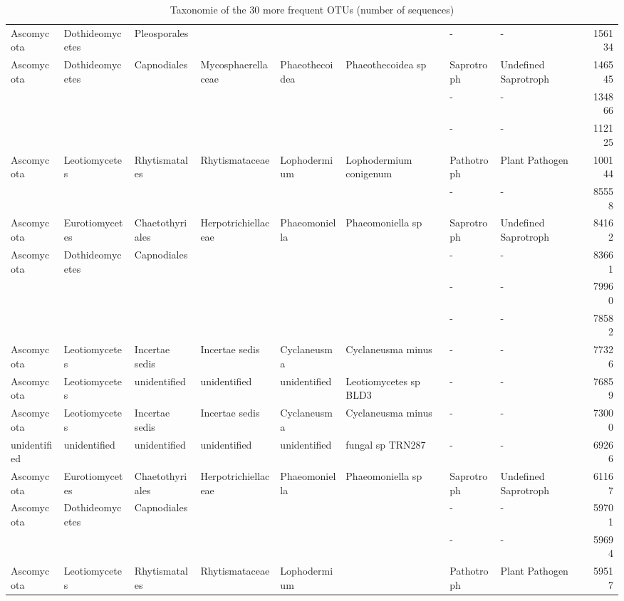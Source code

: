 \documentclass[12pt]{article}\usepackage[]{graphicx}\usepackage[]{color}
\numberwithin{figure}{section}
\begin{document}
\begin{landscape}
\begin{table}[ht]
\begin{tabular}{llllllllr}
  Ascomycota & Dothideomycetes & Pleosporales &  &  &  & - & - & 156134 \\ 
  Ascomycota & Dothideomycetes & Capnodiales & Mycosphaerellaceae & Phaeothecoidea & Phaeothecoidea sp & Saprotroph & Undefined Saprotroph & 146545 \\ 
   &  &  &  &  &  & - & - & 134866 \\ 
   &  &  &  &  &  & - & - & 112125 \\ 
  Ascomycota & Leotiomycetes & Rhytismatales & Rhytismataceae & Lophodermium & Lophodermium conigenum & Pathotroph & Plant Pathogen & 100144 \\ 
   &  &  &  &  &  & - & - & 85558 \\ 
  Ascomycota & Eurotiomycetes & Chaetothyriales & Herpotrichiellaceae & Phaeomoniella & Phaeomoniella sp & Saprotroph & Undefined Saprotroph & 84162 \\ 
  Ascomycota & Dothideomycetes & Capnodiales &  &  &  & - & - & 83661 \\ 
   &  &  &  &  &  & - & - & 79960 \\ 
   &  &  &  &  &  & - & - & 78582 \\ 
  Ascomycota & Leotiomycetes & Incertae sedis & Incertae sedis & Cyclaneusma & Cyclaneusma minus & - & - & 77326 \\ 
  Ascomycota & Leotiomycetes & unidentified & unidentified & unidentified & Leotiomycetes sp BLD3 & - & - & 76859 \\ 
  Ascomycota & Leotiomycetes & Incertae sedis & Incertae sedis & Cyclaneusma & Cyclaneusma minus & - & - & 73000 \\ 
  unidentified & unidentified & unidentified & unidentified & unidentified & fungal sp TRN287 & - & - & 69266 \\ 
  Ascomycota & Eurotiomycetes & Chaetothyriales & Herpotrichiellaceae & Phaeomoniella & Phaeomoniella sp & Saprotroph & Undefined Saprotroph & 61167 \\ 
  Ascomycota & Dothideomycetes & Capnodiales &  &  &  & - & - & 59701 \\ 
   &  &  &  &  &  & - & - & 59694 \\ 
  Ascomycota & Leotiomycetes & Rhytismatales & Rhytismataceae & Lophodermium &  & Pathotroph & Plant Pathogen & 59517 \\ 
   \hline
\end{tabular}
\endgroup
\caption{Taxonomie of the 30 more
             frequent OTUs (number of sequences)} 
\end{table}

\end{landscape}
\end{document}
